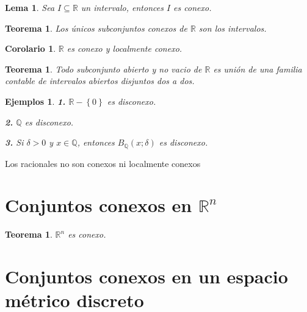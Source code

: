 \documentclass[oneside]{book} %
\theoremstyle{Teorema}
\newtheorem{Teorema}[Definicion]{Teorema}
\newtheorem{Corolario}[Definicion]{Corolario}
\newtheorem{Lema}[Definicion]{Lema}
\theoremstyle{Ejemplos}
\newtheorem{Ejemplos}[Definicion]{Ejemplos}
\theoremstyle{[Obs]}
\renewcommand{\{}{\left\lbrace} %
\renewcommand{\}}{\right\rbrace} %
\renewcommand{\sc}{\subseteq} %
\newcommand{\R}{\mathbb{R}} %
\newcommand{\Rn}{\mathbb{R}^n} %
\begin{document}
			\begin{Lema}\setlength{\parindent}{0em}
			
				Sea $I \sc \R$ un intervalo, entonces $I$ es conexo.
			
			\end{Lema}

			\begin{Teorema}\setlength{\parindent}{0em}
			
				Los únicos subconjuntos conexos de $\R$ son los intervalos.
			
			\end{Teorema}

			\begin{Corolario}\setlength{\parindent}{0em}
			
				$\R$ es conexo y localmente conexo.	
			
			\end{Corolario}

			\begin{Teorema}\setlength{\parindent}{0em}
			
				Todo subconjunto abierto y no vacio de $\R$ es unión de una familia contable de intervalos abiertos disjuntos dos a dos. 
			
			\end{Teorema}

			\begin{Ejemplos}\setlength{\parindent}{0em}
	
				\textbf{1.} $\R - \{ 0 \}$ es disconexo. 
	
				\textbf{2.} $\mathbb{Q}$ es disconexo. 
	
				\textbf{3.} Si $\delta > 0$ y $x \in \mathbb{Q}$, entonces $B_{\mathbb{Q}}(x;\delta)$ es disconexo. 
	
			\end{Ejemplos}
	
			Los racionales no son conexos ni localmente conexos

		\section{Conjuntos conexos en $\Rn$}

			\begin{Teorema}\setlength{\parindent}{0em}
			
				$\Rn$ es conexo.
			
			\end{Teorema}

		\section{Conjuntos conexos en un espacio métrico discreto}
\end{document}
